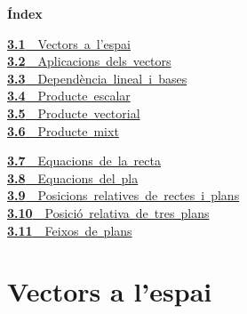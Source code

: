 \documentclass[11pt,a4paper]{article}
\begin{document}
\begin{tcolorbox}[colback=fmsurface,colframe=fmsurface,arc=3mm,left=4mm,right=4mm,top=2mm,bottom=2mm]
\small\textbf{Índex}\par\smallskip
\begin{minipage}[t]{0.49\linewidth}\small \mbox{\hyperlink{sec1}{\textbf{\color{fmgreen}3.1}\ \ Vectors a l'espai}}\\[3pt]
\mbox{\hyperlink{sec2}{\textbf{\color{fmgreen}3.2}\ \ Aplicacions dels vectors}}\\[3pt]
\mbox{\hyperlink{sec3}{\textbf{\color{fmgreen}3.3}\ \ Dependència lineal i bases}}\\[3pt]
\mbox{\hyperlink{sec4}{\textbf{\color{fmgreen}3.4}\ \ Producte escalar}}\\[3pt]
\mbox{\hyperlink{sec5}{\textbf{\color{fmgreen}3.5}\ \ Producte vectorial}}\\[3pt]
\mbox{\hyperlink{sec6}{\textbf{\color{fmgreen}3.6}\ \ Producte mixt}}\\[3pt]\end{minipage}\hfill\begin{minipage}[t]{0.49\linewidth}\small \mbox{\hyperlink{sec7}{\textbf{\color{fmgreen}3.7}\ \ Equacions de la recta}}\\[3pt]
\mbox{\hyperlink{sec8}{\textbf{\color{fmgreen}3.8}\ \ Equacions del pla}}\\[3pt]
\mbox{\hyperlink{sec9}{\textbf{\color{fmgreen}3.9}\ \ Posicions relatives de rectes i plans}}\\[3pt]
\mbox{\hyperlink{sec10}{\textbf{\color{fmgreen}3.10}\ \ Posició relativa de tres plans}}\\[3pt]
\mbox{\hyperlink{sec11}{\textbf{\color{fmgreen}3.11}\ \ Feixos de plans}}\\[3pt]\end{minipage}
\end{tcolorbox}

\section{Vectors a l'espai}\hypertarget{sec1}{}
\end{document}
